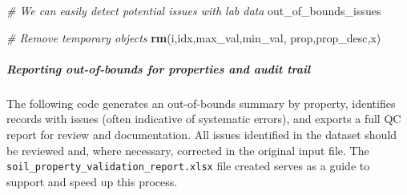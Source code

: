 \documentclass[
  10pt,
  b5paper,
  oneside]{book}
\newenvironment{Shaded}{\begin{snugshade}}{\end{snugshade}}
\newcommand{\CommentTok}[1]{\textcolor[rgb]{0.56,0.35,0.01}{\textit{#1}}}
\newcommand{\FunctionTok}[1]{\textcolor[rgb]{0.13,0.29,0.53}{\textbf{#1}}}
\newcommand{\NormalTok}[1]{#1}
\begin{document}
\begin{Shaded}
\begin{Highlighting}[]
\CommentTok{\# We can easily detect potential issues with lab data}
\NormalTok{out\_of\_bounds\_issues}

\CommentTok{\# Remove temporary objects}
\FunctionTok{rm}\NormalTok{(i,idx,max\_val,min\_val, prop,prop\_desc,x)}
\end{Highlighting}
\end{Shaded}

\subparagraph*{Reporting out-of-bounds for properties and audit trail}\label{reporting-out-of-bounds-for-properties-and-audit-trail}

The following code generates an out-of-bounds summary by property, identifies records with issues (often indicative of systematic errors), and exports a full QC report for review and documentation. All issues identified in the dataset should be reviewed and, where necessary, corrected in the original input file. The \texttt{soil\_property\_validation\_report.xlsx} file created serves as a guide to support and speed up this process.
\end{document}
